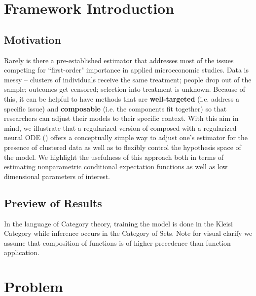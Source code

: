 \documentclass[a4paper,12pt]{article}
\begin{document}




\section{Framework Introduction}
\subsection{Motivation}
Rarely is there a pre-established estimator that addresses most of the issues competing for ``first-order" importance in applied microeconomic studies. Data is  messy -- clusters of individuals receive the same treatment; people drop out of the sample; outcomes get censored; selection into treatment is unknown. Because of this, it can be helpful to have methods that are \textbf{well-targeted} (i.e. address a specific issue) and \textbf{composable} (i.e. the components fit together) so that researchers can adjust their models to their specific context. With this aim in mind, we illustrate that a regularized version of \cite{finn2017model} composed with a regularized neural ODE (\cite{kelly2020learning}) offers a conceptually simple way to adjust one's estimator for the presence of clustered data as well as to flexibly control the hypothesis space of the model. We highlight the usefulness of this approach both in terms of estimating nonparametric conditional expectation functions as well as low dimensional parameters of interest.
\subsection{Preview of Results}
In the language of Category theory, training the model is done in the Kleisi Category while inference occurs in the Category of Sets. Note for visual clarify we assume that composition of functions is of higher precedence than function application.

\section{Problem}
\end{document}
